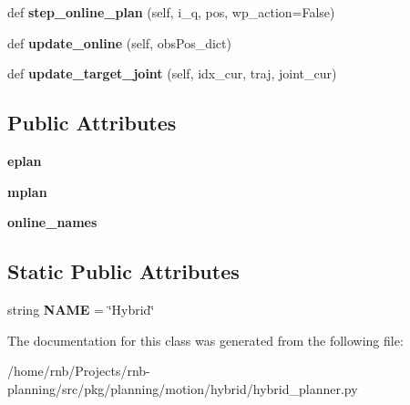 \begin{DoxyCompactItemize}
def {\bfseries step\+\_\+online\+\_\+plan} (self, i\+\_\+q, pos, wp\+\_\+action=False)
\item 
\mbox{\label{classrnb-planning_1_1src_1_1pkg_1_1planning_1_1motion_1_1hybrid_1_1hybrid__planner_1_1_hybrid_planner_a3c4f8671239c342ef068dfd1fb5f63cb}} 
def {\bfseries update\+\_\+online} (self, obs\+Pos\+\_\+dict)
\item 
\mbox{\label{classrnb-planning_1_1src_1_1pkg_1_1planning_1_1motion_1_1hybrid_1_1hybrid__planner_1_1_hybrid_planner_af65e08bc49c48aed46ddac0112783662}} 
def {\bfseries update\+\_\+target\+\_\+joint} (self, idx\+\_\+cur, traj, joint\+\_\+cur)
\end{DoxyCompactItemize}
\subsection*{Public Attributes}
\begin{DoxyCompactItemize}
\item 
\mbox{\label{classrnb-planning_1_1src_1_1pkg_1_1planning_1_1motion_1_1hybrid_1_1hybrid__planner_1_1_hybrid_planner_a0c029fe949a0aae192eecc432fc1288e}} 
{\bfseries eplan}
\item 
\mbox{\label{classrnb-planning_1_1src_1_1pkg_1_1planning_1_1motion_1_1hybrid_1_1hybrid__planner_1_1_hybrid_planner_a726f858cee8921a085aace2f8528f7cd}} 
{\bfseries mplan}
\item 
\mbox{\label{classrnb-planning_1_1src_1_1pkg_1_1planning_1_1motion_1_1hybrid_1_1hybrid__planner_1_1_hybrid_planner_a5e93c4479b9b4584e30dd1dcd04dcebb}} 
{\bfseries online\+\_\+names}
\end{DoxyCompactItemize}
\subsection*{Static Public Attributes}
\begin{DoxyCompactItemize}
\item 
\mbox{\label{classrnb-planning_1_1src_1_1pkg_1_1planning_1_1motion_1_1hybrid_1_1hybrid__planner_1_1_hybrid_planner_a17cbc3e1eca48e3eb17cbf5a2540c1d9}} 
string {\bfseries N\+A\+ME} = \char`\"{}Hybrid\char`\"{}
\end{DoxyCompactItemize}


The documentation for this class was generated from the following file\+:\begin{DoxyCompactItemize}
\item 
/home/rnb/\+Projects/rnb-\/planning/src/pkg/planning/motion/hybrid/hybrid\+\_\+planner.\+py\end{DoxyCompactItemize}
